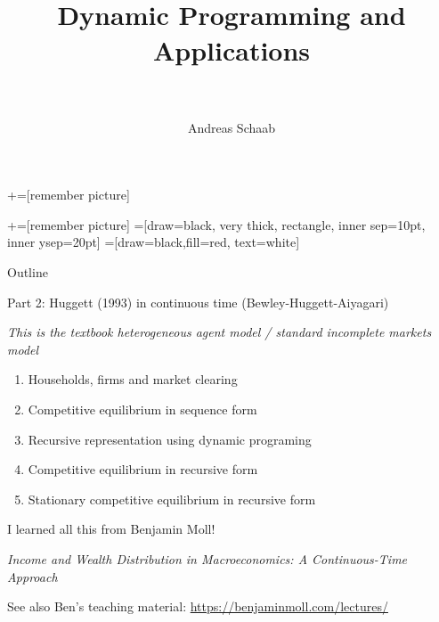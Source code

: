 \documentclass[11pt, aspectratio=169]{beamer}
\title[]{\\[8pt]
	{\large \color{blue} Dynamic Programming and Applications \\[5pt] \normalfont{Heterogeneous Agents and Inequality} \\[10pt] \normalfont{Lecture 11}}}
\author[Schaab]{Andreas Schaab}
\institute{}
\date{}
\begin{document}
+=[remember picture]

\newcommand\marktopleft[1]{%
	\tikz[overlay,remember picture] 
	\node (marker-#1-a) at (-.3em,.3em) {};%
}
\newcommand\markbottomright[2]{%
	\tikz[overlay,remember picture] 
	\node (marker-#1-b) at (0em,0em) {};%
}
+=[remember picture] 
 =[draw=black, very thick, rectangle, inner sep=10pt, inner ysep=20pt]
 =[draw=black,fill=red, text=white]


\addtocounter{framenumber}{-1}
\thispagestyle{empty}
\maketitle 
\newpage



\begin{frame}{Outline}
\thispagestyle{empty}
\addtocounter{framenumber}{-1}

Part 2: Huggett (1993) in continuous time (Bewley-Huggett-Aiyagari)

\vspace{2mm}
\textit{This is the textbook heterogeneous agent model / standard incomplete markets model}

\vspace{2mm}
\begin{enumerate}
\item Households, firms and market clearing

\item Competitive equilibrium in sequence form

\item Recursive representation using dynamic programing

\item Competitive equilibrium in recursive form

\item Stationary competitive equilibrium in recursive form
\end{enumerate}


\vspace{8mm}
I learned all this from Benjamin Moll!

{\footnotesize \textit{Income and Wealth Distribution in Macroeconomics: A Continuous-Time Approach}}
 
\vspace{3mm}
See also Ben's teaching material: \url{https://benjaminmoll.com/lectures/}

% 
% 
\end{frame}
\end{document}
